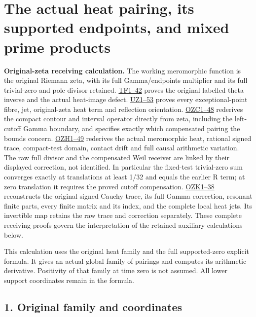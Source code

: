 \documentclass[
  10pt,
  a4paper,
]{article}
\author{}
\date{}
\begin{document}
{
\setcounter{tocdepth}{3}
\tableofcontents
}
\section{The actual heat pairing, its supported endpoints, and mixed
prime
products}\label{the-actual-heat-pairing-its-supported-endpoints-and-mixed-prime-products}

\textbf{Original-zeta receiving calculation.} The working meromorphic
function is the original Riemann zeta, with its full Gamma/endpoints
multiplier and its full trivial-zero and pole divisor retained.
\href{FAITHFUL_THETA_COMPLETION_RETURN.md}{TF1--42} proves the original
labelled theta inverse and the actual heat-image defect.
\href{FAITHFUL_UNCOMPLETED_ZETA_HEAT.md}{UZ1--53} proves every
exceptional-point fibre, jet, original-zeta heat term and reflection
orientation.
\href{ORIGINAL_ZETA_COMPACT_WEIL_RECONSTRUCTION.md}{OZC1--48} rederives
the compact contour and interval operator directly from zeta, including
the left-cutoff Gamma boundary, and specifies exactly which compensated
pairing the bounds concern.
\href{ORIGINAL_ZETA_HEAT_CONTACT_RECONSTRUCTION.md}{OZH1--49} rederives
the actual meromorphic heat, rational signed trace, compact-test domain,
contact drift and full causal arithmetic variation. The raw full divisor
and the compensated Weil receiver are linked by their displayed
correction, not identified. In particular the fixed-test trivial-zero
sum converges exactly at translations at least 1/32 and equals the
earlier R term; at zero translation it requires the proved cutoff
compensation. \href{ORIGINAL_ZETA_CAUCHY_RECONSTRUCTION.md}{OZK1--38}
reconstructs the original signed Cauchy trace, its full Gamma
correction, resonant finite parts, every finite matrix and its index,
and the complete local heat jets. Its invertible map retains the raw
trace and correction separately. These complete receiving proofs govern
the interpretation of the retained auxiliary calculations below.

This calculation uses the original heat family and the full
supported-zero explicit formula. It gives an actual global family of
pairings and computes its arithmetic derivative. Positivity of that
family at time zero is not assumed. All lower support coordinates remain
in the formula.

\subsection{1. Original family and
coordinates}\label{original-family-and-coordinates}
\end{document}
